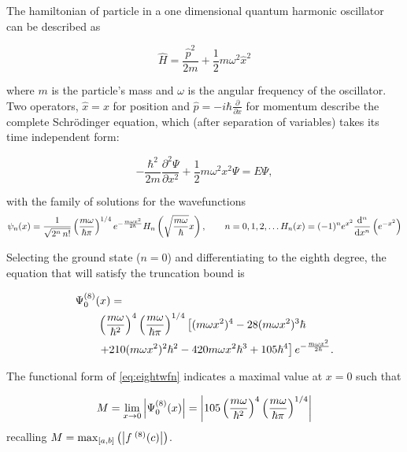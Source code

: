 The hamiltonian of particle in a one dimensional quantum harmonic oscillator can be described as

\begin{equation}
\widehat{H} = \frac{\widehat{p}^2}{2m}+\frac{1}{2}m\omega^2\widehat{x}^2\label{eq:hamho}
\end{equation}

where $m$ is the particle's mass and $ω$ is the angular frequency of the oscillator.
Two operators, $\widehat{x} = x$ for position and $\widehat{p} = -i\hbar \frac{\partial}{\partial x}$ for momentum describe the complete Schr\"{o}dinger equation, which (after separation of variables) takes its time independent form:

\begin{equation}
-\frac{\hbar^2}{2m}\frac{\partial^2 \Psi}{\partial x^2}+\frac{1}{2}m\omega^2x^2 \Psi = E\Psi,
\label{eq:hamti}
\end{equation}

with the family of solutions for the wavefunctions
\begin{equation}\psi_n(x) = \frac{1}{\sqrt{2^n\,n!}}\left(\frac{m\omega}{\hbar\pi}\right)^{1/4}e^{
- \frac{m\omega x^2}{2 \hbar}} H_n\left(\sqrt{\frac{m\omega}{\hbar}} x \right),\qquad n = 0,1,2,\ldots\\
H_n(x)=(-1)^n e^{x^2}\frac{\mathrm{d}^n}{\mathrm{d}x^n}\left(e^{-x^2}\right)
\end{equation}

Selecting the ground state ($n=0$) and differentiating to the eighth degree, the equation that will satisfy the truncation bound is

\begin{align}
\MoveEqLeft \Psi_0^{(8)}(x) = \nonumber\\
&\left(\frac{m\omega}{\hbar^2}\right)^4\left(\frac{m\omega}{\hbar\pi}\right)^{1/4}\left[(m\omega x^2)^4-28 (m\omega x^2)^3\hbar\right.\nonumber\\
&\left.+210(m\omega x^2)^2\hbar ^2-420m\omega x^2\hbar^3+105\hbar^4\right]e^{-\frac{m\omega x^2}{2\hbar}}.
\label{eq:eightwfn}
\end{align}

The functional form of \cref{eq:eightwfn} indicates a maximal value at $x=0$ such that

\begin{equation}
M = \lim_{x \to 0} \left\lvert \Psi_0^{(8)}(x)\right\rvert = \left\lvert 105\left(\frac{m\omega}{\hbar^2}\right)^4\left(\frac{m\omega}{\hbar\pi}\right)^{1/4}\right\rvert
\label{eq:Mlimit}
\end{equation}
recalling $M = \mathrm{max}_{[a,b]}\left(\left\lvert f^{\;(8)}(c)\right\rvert\right)$.

